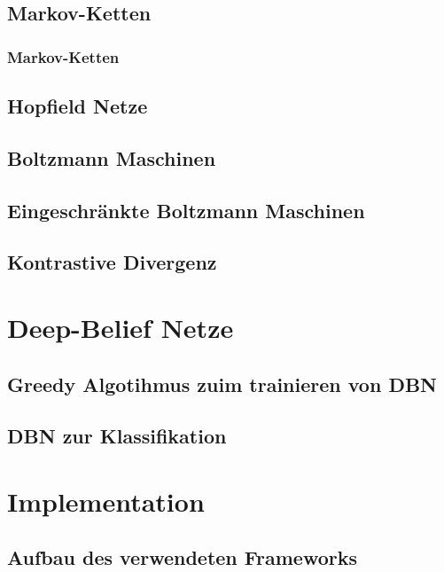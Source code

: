 \documentclass[12pt,titlepage]{beamer}
\begin{document}
	\subsection{Markov-Ketten}
	\begin{frame}
	\frametitle{Markov-Ketten}
	\end{frame}
	\subsection{Hopfield Netze}
	\begin{frame}
	\end{frame}
	\subsection{Boltzmann Maschinen}
	\begin{frame}
	\end{frame}
	\subsection{Eingeschränkte Boltzmann Maschinen}
	\begin{frame}
	\end{frame}
	\subsection{Kontrastive Divergenz}
	\begin{frame}
	\end{frame}
	\section{Deep-Belief Netze}
	\subsection{Greedy Algotihmus zuim trainieren von DBN}
	\begin{frame}
	\end{frame}
	\subsection{DBN zur Klassifikation}
	\begin{frame}
	\end{frame}
	\section{Implementation}
	\subsection{Aufbau des verwendeten Frameworks}
	\begin{frame}
	\end{frame}
\end{document}
